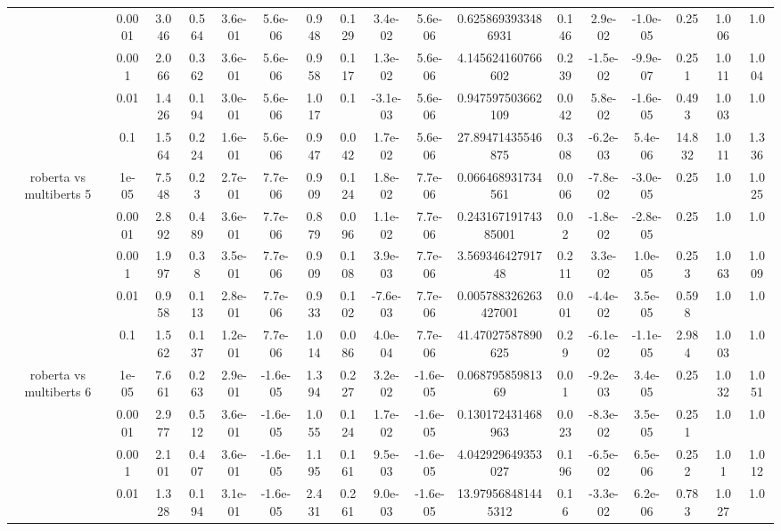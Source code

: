 \begin{tabular}{|c|c|c|c|c|c|c|c|c|c|c|c|c|c|c|c|c|}
 & 0.0001 & 3.046 & 0.564 & 3.6e-01 & 5.6e-06 & 0.948 & 0.129 & 3.4e-02 & 5.6e-06 & 0.6258693933486931 & 0.146 & 2.9e-02 & -1.0e-05 & 0.25 & 1.006 & 1.0 \\
 & 0.001 & 2.066 & 0.362 & 3.6e-01 & 5.6e-06 & 0.958 & 0.117 & 1.3e-02 & 5.6e-06 & 4.145624160766602 & 0.239 & -1.5e-02 & -9.9e-07 & 0.251 & 1.011 & 1.004 \\
 & 0.01 & 1.426 & 0.194 & 3.0e-01 & 5.6e-06 & 1.017 & 0.1 & -3.1e-03 & 5.6e-06 & 0.947597503662109 & 0.042 & 5.8e-02 & -1.6e-05 & 0.493 & 1.003 & 1.0 \\
 & 0.1 & 1.564 & 0.224 & 1.6e-01 & 5.6e-06 & 0.947 & 0.042 & 1.7e-02 & 5.6e-06 & 27.89471435546875 & 0.308 & -6.2e-03 & 5.4e-06 & 14.832 & 1.011 & 1.336 \\
\hline
\multirow{5}{*}{roberta  vs multiberts 5} & 1e-05 & 7.548 & 0.23 & 2.7e-01 & 7.7e-06 & 0.909 & 0.124 & 1.8e-02 & 7.7e-06 & 0.066468931734561 & 0.006 & -7.8e-02 & -3.0e-05 & 0.25 & 1.0 & 1.025 \\
 & 0.0001 & 2.892 & 0.489 & 3.6e-01 & 7.7e-06 & 0.879 & 0.096 & 1.1e-02 & 7.7e-06 & 0.24316719174385001 & 0.02 & -1.8e-02 & -2.8e-05 & 0.25 & 1.0 & 1.0 \\
 & 0.001 & 1.997 & 0.38 & 3.5e-01 & 7.7e-06 & 0.909 & 0.108 & 3.9e-03 & 7.7e-06 & 3.56934642791748 & 0.211 & 3.3e-02 & 1.0e-05 & 0.253 & 1.063 & 1.009 \\
 & 0.01 & 0.958 & 0.113 & 2.8e-01 & 7.7e-06 & 0.933 & 0.102 & -7.6e-03 & 7.7e-06 & 0.005788326263427001 & 0.001 & -4.4e-02 & 3.5e-05 & 0.598 & 1.0 & 1.0 \\
 & 0.1 & 1.562 & 0.137 & 1.2e-01 & 7.7e-06 & 1.014 & 0.086 & 4.0e-04 & 7.7e-06 & 41.47027587890625 & 0.29 & -6.1e-02 & -1.1e-05 & 2.984 & 1.003 & 1.0 \\
\hline
\multirow{5}{*}{roberta  vs multiberts 6} & 1e-05 & 7.661 & 0.263 & 2.9e-01 & -1.6e-05 & 1.394 & 0.227 & 3.2e-02 & -1.6e-05 & 0.06879585981369 & 0.01 & -9.2e-03 & 3.4e-05 & 0.25 & 1.032 & 1.051 \\
 & 0.0001 & 2.977 & 0.512 & 3.6e-01 & -1.6e-05 & 1.055 & 0.124 & 1.7e-02 & -1.6e-05 & 0.130172431468963 & 0.023 & -8.3e-02 & 3.5e-05 & 0.251 & 1.0 & 1.0 \\
 & 0.001 & 2.101 & 0.407 & 3.6e-01 & -1.6e-05 & 1.195 & 0.161 & 9.5e-03 & -1.6e-05 & 4.042929649353027 & 0.196 & -6.5e-02 & 6.5e-06 & 0.252 & 1.01 & 1.012 \\
 & 0.01 & 1.328 & 0.194 & 3.1e-01 & -1.6e-05 & 2.431 & 0.261 & 9.0e-03 & -1.6e-05 & 13.979568481445312 & 0.16 & -3.3e-02 & 6.2e-06 & 0.783 & 1.027 & 1.0 \\

\end{tabular}
